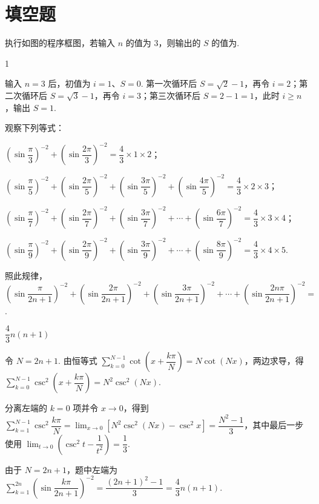 \section{填空题}

\begin{problem}
执行如图的程序框图，若输入 \(n\) 的值为 \(3\)，则输出的 \(S\) 的值为\fillinblank{}.

\end{problem}

\begin{answer}
1
\end{answer}

\begin{solution}
输入 \(n=3\) 后，初值为 \(i=1\)、\(S=0\). 第一次循环后 \(S=\sqrt2-1\)，再令 \(i=2\)；第二次循环后 \(S=\sqrt3-1\)，再令 \(i=3\)；第三次循环后 \(S=2-1=1\)，此时 \(i\geq n\)，输出 \(S=1\).
\end{solution}

\begin{problem}
观察下列等式：

\(\left(\sin\dfrac{\pi}{3}\right)^{-2}+\left(\sin\dfrac{2\pi}{3}\right)^{-2}=\dfrac43\times1\times2\)；

\(\left(\sin\dfrac{\pi}{5}\right)^{-2}+\left(\sin\dfrac{2\pi}{5}\right)^{-2}+\left(\sin\dfrac{3\pi}{5}\right)^{-2}+\left(\sin\dfrac{4\pi}{5}\right)^{-2}=\dfrac43\times2\times3\)；

\(\left(\sin\dfrac{\pi}{7}\right)^{-2}+\left(\sin\dfrac{2\pi}{7}\right)^{-2}+\left(\sin\dfrac{3\pi}{7}\right)^{-2}+\cdots+\left(\sin\dfrac{6\pi}{7}\right)^{-2}=\dfrac43\times3\times4\)；

\(\left(\sin\dfrac{\pi}{9}\right)^{-2}+\left(\sin\dfrac{2\pi}{9}\right)^{-2}+\left(\sin\dfrac{3\pi}{9}\right)^{-2}+\cdots+\left(\sin\dfrac{8\pi}{9}\right)^{-2}=\dfrac43\times4\times5\).

照此规律，
\(\left(\sin\dfrac{\pi}{2n+1}\right)^{-2}+\left(\sin\dfrac{2\pi}{2n+1}\right)^{-2}+\left(\sin\dfrac{3\pi}{2n+1}\right)^{-2}+\cdots+\left(\sin\dfrac{2n\pi}{2n+1}\right)^{-2}=\)\fillinblank{}.
\end{problem}

\begin{answer}
\(\dfrac{4}{3}n(n+1)\)
\end{answer}

\begin{solution}
令 \(N=2n+1\). 由恒等式 \(\displaystyle\sum_{k=0}^{N-1}\cot\left(x+\dfrac{k\pi}{N}\right)=N\cot(Nx)\)，两边求导，得
\(\displaystyle\sum_{k=0}^{N-1}\csc^2\left(x+\dfrac{k\pi}{N}\right)=N^2\csc^2(Nx)\).

分离左端的 \(k=0\) 项并令 \(x\to0\)，得到
\(\displaystyle\sum_{k=1}^{N-1}\csc^2\dfrac{k\pi}{N}=\lim_{x\to0}\left[N^2\csc^2(Nx)-\csc^2x\right]=\dfrac{N^2-1}{3}\)，其中最后一步使用 \(\displaystyle\lim_{t\to0}\left(\csc^2t-\dfrac1{t^2}\right)=\dfrac13\).

由于 \(N=2n+1\)，题中左端为
\(\displaystyle\sum_{k=1}^{2n}\left(\sin\dfrac{k\pi}{2n+1}\right)^{-2}=\dfrac{(2n+1)^2-1}{3}=\dfrac43n(n+1)\).
\end{solution}

